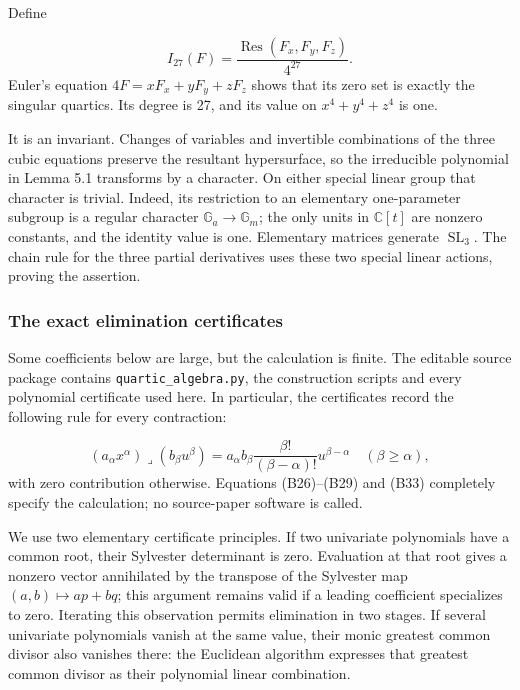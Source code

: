 \documentclass[
]{article}
\begin{document}
Define \protect{}\label{equation-B32}{}

\[
I_{27}(F)=\frac{\operatorname{Res}(F_x,F_y,F_z)}{4^{27}}.
\tag{B32}
\] Euler's equation \(4F=xF_x+yF_y+zF_z\) shows that its zero set is
exactly the singular quartics. Its degree is 27, and its value on
\(x^4+y^4+z^4\) is one.

It is an invariant. Changes of variables and invertible combinations of
the three cubic equations preserve the resultant hypersurface, so the
irreducible polynomial in Lemma 5.1 transforms by a character. On either
special linear group that character is trivial. Indeed, its restriction
to an elementary one-parameter subgroup is a regular character
\(\mathbb G_a\to\mathbb G_m\); the only units in \(\mathbb C [t]\) are
nonzero constants, and the identity value is one. Elementary matrices
generate \(\operatorname{SL}_3\). The chain rule for the three partial
derivatives uses these two special linear actions, proving the
assertion.

\subsubsection{The exact elimination
certificates}\label{the-exact-elimination-certificates}

Some coefficients below are large, but the calculation is finite. The
editable source package contains \texttt{quartic\_algebra.py}, the
construction scripts and every polynomial certificate used here. In
particular, the certificates record the following rule for every
contraction: \protect{}\label{equation-B33}{}

\[
(a_\alpha x^\alpha)\mathbin{\lrcorner}(b_\beta u^\beta)
=a_\alpha b_\beta\frac{\beta!}{(\beta-\alpha)!}u^{\beta-\alpha}
\quad(\beta\geq\alpha),
\tag{B33}
\] with zero contribution otherwise. Equations (B26)--(B29) and (B33)
completely specify the calculation; no source-paper software is called.

We use two elementary certificate principles. If two univariate
polynomials have a common root, their Sylvester determinant is zero.
Evaluation at that root gives a nonzero vector annihilated by the
transpose of the Sylvester map \((a,b)\mapsto ap+bq\); this argument
remains valid if a leading coefficient specializes to zero. Iterating
this observation permits elimination in two stages. If several
univariate polynomials vanish at the same value, their monic greatest
common divisor also vanishes there: the Euclidean algorithm expresses
that greatest common divisor as their polynomial linear combination.
\end{document}
